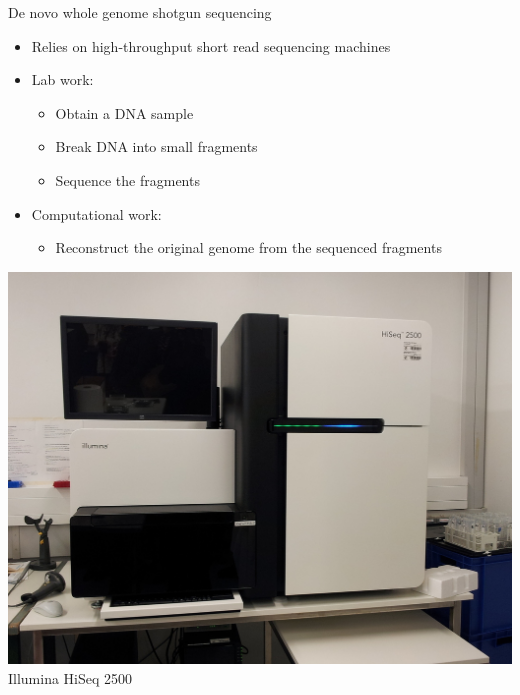 \documentclass[xcolor=dvipsnames]{beamer}
\begin{document}
\begin{frame}{De novo whole genome shotgun sequencing}
    \begin{minipage}{0.66\textwidth}
        \begin{itemize}
            \item Relies on high-throughput short read sequencing machines
            \item Lab work:
                \begin{itemize}
                    \item Obtain a DNA sample
                    \item Break DNA into small fragments
                    \item Sequence the fragments
                \end{itemize}
            \item Computational work:
                \begin{itemize}
                    \item Reconstruct the original genome from the sequenced
                          fragments
                \end{itemize}
        \end{itemize}
    \end{minipage}
    \begin{minipage}{0.32\textwidth}
        \begin{center}
            \includegraphics[width=1.0\textwidth]{Illumina_HiSeq_2500.jpg} \\
                Illumina HiSeq 2500 \\

\end{center}
\end{minipage}
\end{frame}
\end{document}
